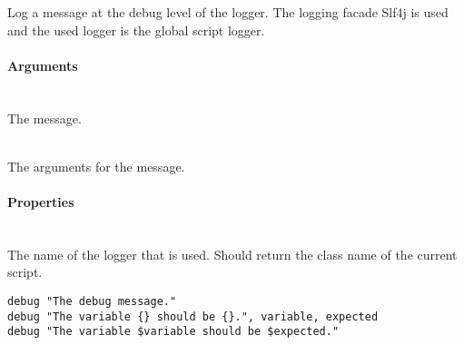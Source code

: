 %


Log a message at the debug level of the logger.
The logging facade Slf4j\cite{slf4j13} is used and the used logger is
the global script logger.

\paragraph{Arguments}

\begin{asparadesc}
%
\item[\code{message}] \hfill \\
The message.
%
\item[\code{args}] \hfill \\
The arguments for the message.
%
\end{asparadesc}

\paragraph{Properties}

\begin{asparadesc}
%
\item[\code{name}] \hfill \\
The name of the logger that is used. Should return the class name of the current
script.
%
\end{asparadesc}

\begin{lstlisting}[style=Groovybash, label={lst:example_debug}]
debug "The debug message."
debug "The variable {} should be {}.", variable, expected
debug "The variable $variable should be $expected."
\end{lstlisting}

